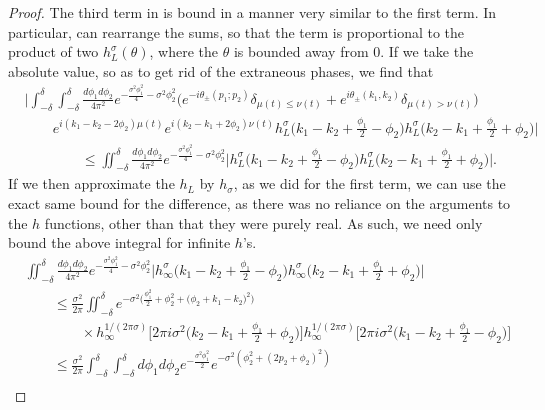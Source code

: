 \documentclass[../thesis-main/thesis-main]{subfiles}
\begin{document}
\begin{proof}
The third term in  is bound in a manner very similar to the first term. In particular, can rearrange the sums, so that the term is proportional to the product of two $h_L^\sigma(\theta)$, where the $\theta$ is bounded away from 0.  If we take the absolute value, so as to get rid of the extraneous phases, we find that
\begin{align}
&\Bigg| \int_{-\delta}^\delta \int_{-\delta}^{\delta} \frac{ d\phi_1 d\phi_2}{4\pi^2} e^{ - \frac{\sigma^2\phi_1^2}{4} - \sigma^2 \phi_2^2} \Big(e^{-i\theta_{\pm}(p_1;p_2)}\delta_{\mu(t)\leq\nu(t)} + e^{i  \theta_{\pm}(k_1,k_2)}\delta_{\mu(t) > \nu(t)}\Big) \nonumber\\
&\qquad e^{i (k_1-k_2  - 2\phi_2)\mu(t)}e^{i(k_2 -k_1 +2\phi_2)\nu(t)}h_L^\sigma \Big(k_1 -k_2 +\frac{\phi_1}{2} - \phi_2\Big) h_L^\sigma \Big(k_2 - k_1 + \frac{\phi_1}{2} + \phi_2\Big)\Bigg|\nonumber\\
&\qquad \qquad \leq \iint_{-\delta}^\delta \frac{d\phi_1d\phi_2}{4\pi^2} e^{ - \frac{\sigma^2\phi_1^2}{4} - \sigma^2 \phi_2^2}\bigg| h_L^\sigma \Big(k_1 -k_2 +\frac{\phi_1}{2} - \phi_2\Big) h_L^\sigma \Big(k_2 - k_1 + \frac{\phi_1}{2} + \phi_2\Big)\bigg|.
\end{align}
If we then approximate the $h_L$ by $h_\sigma$, as we did for the first term, we can use the exact same bound for the difference, as there was no reliance on the arguments to the $h$ functions, other than that they were purely real.  As such, we need only bound the above integral for infinite $h$'s.
\begin{align}
&\iint_{-\delta}^\delta \frac{d\phi_1d\phi_2}{4\pi^2} e^{ - \frac{\sigma^2\phi_1^2}{4} - \sigma^2 \phi_2^2}\bigg| h_\infty^\sigma \Big(k_1 -k_2 +\frac{\phi_1}{2} - \phi_2\Big) h_\infty^\sigma \Big(k_2 - k_1 + \frac{\phi_1}{2} + \phi_2\Big)\bigg|\nonumber\\
&\qquad \leq \frac{\sigma^2}{2\pi} \iint_{-\delta}^\delta e^{-\sigma^2\big( \frac{\phi_1^2}{2}  + \phi_2^2 + \big( \phi_2 + k_1-k_2\big)^2\big)} \nonumber\\
&\qquad\qquad\times h_{\infty}^{1/(2\pi\sigma)} \Big[2\pi i \sigma^2 \Big(k_2 - k_1 + \frac{\phi_1}{2} +\phi_2 \Big)\Big] h_\infty^{1/(2\pi\sigma)}\Big[ 2\pi i \sigma^2  \Big(k_1 - k_2+ \frac{\phi_1}{2}  -\phi_2 \Big) \Big]\\
    & \qquad\leq  \frac{\sigma^2}{2\pi}\int_{-\delta}^\delta \int_{-\delta}^\delta {d\phi_1 d\phi_2}  e^{- \frac{\sigma^2 \phi_1^2}{2}}e^{-\sigma^2 (\phi_2^2 + (2p_2 + \phi_2)^2)}\nonumber\\

\end{align}
\end{proof}
\end{document}
